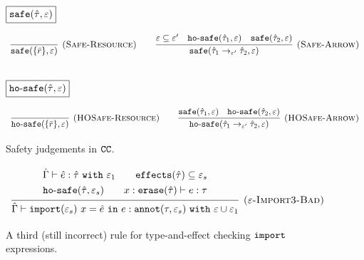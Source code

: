 \begin{figure}
\vspace*{-5mm}
\noindent
$\fbox{$\mathtt{safe}(\hat \tau, \varepsilon)$}$

\vspace{-2mm}
\[
\begin{array}{c}
\infer[\textsc{(Safe-Resource)}]
	{ \kwa{safe}(\{ \bar r \}, \varepsilon) }
	{} 
\hspace{5ex}
	
\infer[\textsc{(Safe-Arrow)}]
	{\kwa{safe}(\hat \tau_1 \rightarrow_{\varepsilon'} \hat \tau_2, \varepsilon)}
	{\varepsilon \subseteq \varepsilon' & \kwa{ho \hyphen safe}(\hat \tau_1, \varepsilon) & \kwa{safe}(\hat \tau_2, \varepsilon)} \\[3ex]

\end{array}
\]

\noindent
$\fbox{$\mathtt{ho \hbox{-} safe}(\hat \tau, \varepsilon)$}$

\vspace{-2mm}
\[
\begin{array}{c}
\infer[\textsc{(HOSafe-Resource)}]
	{ \kwa{ho \hyphen safe}( \{ \bar r \}, \varepsilon)} 
	{}
\hspace{5ex}

\infer[\textsc{(HOSafe-Arrow)}]
	{ \kwa{ho \hyphen safe}( \hat \tau_1 \rightarrow_{\varepsilon'} \hat \tau_2, \varepsilon ) }
	{ \kwa{safe}(\hat \tau_1, \varepsilon)  & \kwa{ho \hyphen safe}(\hat \tau_2, \varepsilon) }
\end{array}
\]
\vspace*{-5mm}
\caption{Safety judgements in $\mathtt{CC}$.}
\vspace*{-7mm}
\label{fig:safe_defns}
\end{figure}

\begin{figure}
\[
\begin{array}{c}
\infer[\textsc{($\varepsilon$-Import3-Bad)}]
	{ \hat \Gamma \vdash \kwa{import}(\varepsilon_s)~x = \hat e~\kw{in} e: \kwa{annot}(\tau, \varepsilon_s)~\kw{with} \varepsilon \cup \varepsilon_1 }
{{\def\arraystretch{1.4}
  \begin{array}{c}
\hat \Gamma \vdash \hat e: \hat \tau~\kw{with} \varepsilon_1
~~~~~~
\kwa{effects}(\hat \tau) \subseteq \varepsilon_s \\[-.5mm]
\hosafe{\hat \tau}{\varepsilon_s} ~~~~~~ x: \kwa{erase}(\hat \tau) \vdash e: \tau
  \end{array}}} 
\end{array}
\]
\vspace*{-5mm}
\caption{A third (still incorrect) rule for type-and-effect checking $\mathtt{import}$ expressions.}
\vspace*{-5mm}
\label{fig:import_rule3}
\end{figure}

